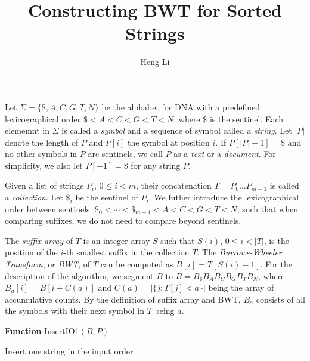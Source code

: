 \documentclass[10pt]{article}
\title{Constructing BWT for Sorted Strings}
\author{Heng Li}
\begin{document}
\maketitle

Let $\Sigma=\{\$,A,C,G,T,N\}$ be the alphabet for DNA with a predefined
lexicographical order $\$<A<C<G<T<N$, where $\$$ is the sentinel.  Each
elememnt in $\Sigma$ is called a \emph{symbol} and a sequence of symbol called
a \emph{string}. Let $|P|$ denote the length of $P$ and $P[i]$ the symbol at
position $i$. If $P[|P|-1]=\$$ and no other symbols in $P$ are sentinels, we
call $P$ as a \emph{text} or a \emph{document}. For simplicity, we also let
$P[-1]=\$$ for any string $P$.

Given a list of strings $P_i$, $0\le i<m$, their concatenation $T=P_0\ldots
P_{m-1}$ is called a \emph{collection}. Let $\$_i$ be the sentinel of $P_i$.
We futher introduce the lexicographical order between sentinels:
$\$_0<\cdots<\$_{m-1}<A<C<G<T<N$, such that when comparing suffixes, we do not
need to compare beyond sentinels.

The \emph{suffix array} of $T$ is an integer array $S$ such that $S(i)$, $0\le
i<|T|$, is the position of the $i$-th smallest suffix in the collection $T$.
The \emph{Burrows-Wheeler Transform}, or \emph{BWT}, of $T$ can be computed as
$B[i]=T[S(i)-1]$. For the description of the algorithm, we segment $B$ to
$B=B_{\$}B_AB_CB_GB_TB_N$, where $B_a[i]=B[i+C(a)]$ and $C(a)=|\{j:T[j]<a\}|$
being the array of accumulative counts. By the definition of suffix array and
BWT, $B_a$ consists of all the symbols with their next symbol in $T$ being
$a$.

\begin{algorithm}[h]
\DontPrintSemicolon
\footnotesize
{}
\BlankLine
\textbf{Function} {\sc InsertIO1}$(B,P)$
\caption{Insert one string in the input order}
\end{algorithm}
\end{document}
